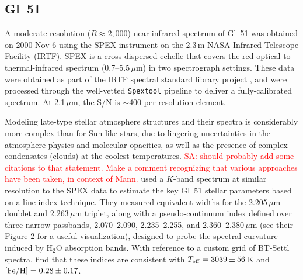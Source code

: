 \documentclass[iop,floatfix]{emulateapj}
\newcommand{\comm}[1]{ \textcolor{red}{SA: #1}}
\begin{document}




\subsection{Gl~51}

A moderate resolution ($R\approx2,000$) near-infrared spectrum of Gl~51 was obtained on 2000 
Nov 6 using the SPEX instrument \citep{rayner03} on the 2.3\,m NASA Infrared Telescope Facility 
(IRTF).  SPEX is a cross-dispersed echelle that covers the red-optical to thermal-infrared spectrum 
(0.7--5.5\,$\mu$m) in two spectrograph settings.  These data were obtained as part of the IRTF 
spectral standard library project \citep{cushing05,rayner09}, and were processed through the 
well-vetted {\tt Spextool} pipeline \citep{cushing04,vacca03} to deliver a fully-calibrated 
spectrum.  At 2.1\,$\mu$m, the S/N is $\sim$400 per resolution element.

Modeling late-type stellar atmosphere structures and their spectra is considerably more complex 
than for Sun-like stars, due to lingering uncertainties in the atmosphere physics and molecular 
opacities, as well as the presence of complex condensates (clouds) at the coolest temperatures.  
\comm{should probably add some citations to that statement.  Make a comment recognizing that 
various approaches have been taken, in context of Mann.}  \citet{rojas-ayala12} used a $K$-band 
spectrum at similar resolution to the SPEX data to estimate the key Gl~51 stellar parameters based 
on a line index technique.  They measured equivalent widths for the 2.205\,$\mu$m  
doublet and 2.263\,$\mu$m  triplet, along with a pseudo-continuum index defined over 
three narrow passbands, 2.070--2.090, 2.235--2.255, and 2.360--2.380\,$\mu$m (see their Figure 2 
for a useful visualization), designed to probe the spectral curvature induced by H$_2$O absorption 
bands.  With reference to a custom grid of {\sc BT-Settl} spectra, \citet{rojas-ayala12} find that 
these indices are consistent with $T_{\rm eff} = 3039\pm56$\,K and $[{\rm Fe/H}] = 0.28\pm0.17$.  
\end{document}
